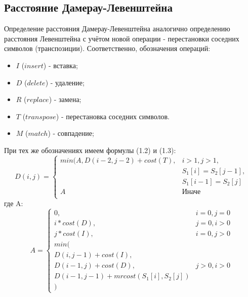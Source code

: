 \subsection{Расстояние Дамерау-Левенштейна}
Определение расстояния Дамерау-Левенштейна аналогично определению расстояния Левенштейна с учётом новой операции - перестановки соседних символов (транспозиции). Соответственно, обозначения операций:
\begin{itemize}
    \item $I$ ($insert$) - вставка;
    \item $D$ ($delete$) - удаление;
    \item $R$ ($replace$) - замена;
    \item $T$ ($transpose$) - перестановка соседних символов.
    \item $M$ ($match$) - совпадение;
\end{itemize}

При тех же обозначениях имеем формулы (1.2) и (1.3):
\begin{equation}
D(i,j) = \left\{ \begin{array}{ll}
 min(A, D(i - 2, j - 2) + cost(T), & \textrm{$i > 1, j > 1,$}\\
 & \textrm{$S_1[i] = S_2[j - 1],$}\\
 & \textrm{$S_1[i - 1] = S_2[j]$}\\
 A & \textrm{Иначе}\\
  \end{array} \right.
\end{equation}
где A:
\begin{equation}
A = \left\{ \begin{array}{ll}
 0, & \textrm{$i = 0, j = 0$}\\
 i * cost(D), & \textrm{$j = 0, i > 0$}\\
 j * cost(I), & \textrm{$i = 0, j > 0$}\\
min(\\
D(i,j-1) + cost(I),\\
D(i-1, j) + cost(D), &\textrm{$j > 0, i > 0$}\\
D(i-1, j-1) + mrcost(S_1[i], S_2[j])\\
)
  \end{array} \right.
\end{equation}


